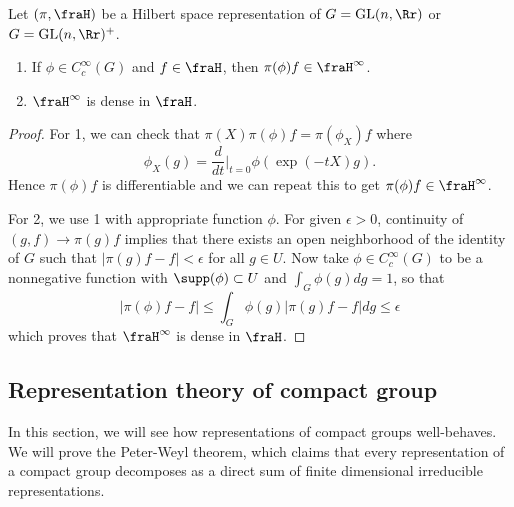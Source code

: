 \begin{proposition}
Let $(\pi, \fraH)$ be a Hilbert space representation of $G = \GL(n, \Rr)$ or $G = \GL(n, \Rr)^{+}$. 
\begin{enumerate}
\item If $\phi\in C_{c}^{\infty}(G)$ and $f\in \fraH$, then $\pi(\phi)f \in \fraH^{\infty}$. 
\item $\fraH^{\infty}$ is dense in $\fraH$. 
\end{enumerate}
\end{proposition}
\begin{proof}
For 1, we can check that $\pi(X)\pi(\phi)f = \pi(\phi_{X})f$ where $$\phi_{X}(g) = \frac{d}{dt}\Big|_{t=0} \phi(\exp(-tX)g).$$ 
Hence $\pi(\phi)f$ is differentiable and we can repeat this to get $\pi(\phi)f\in \fraH^{\infty}$. 

For 2, we use 1 with appropriate function $\phi$. For given $\epsilon>0$, continuity of $(g, f)\to \pi(g)f$ implies that there exists an open neighborhood of the identity of $G$ such that $|\pi(g)f - f|<\epsilon$ for all $g\in U$. 
Now take $\phi\in C_{c}^{\infty}(G)$ to be a nonnegative function with $\supp(\phi)\subset U$ and $\int_{G}\phi(g) dg = 1$, so that 
$$
|\pi(\phi)f - f| \leq \int_{G} \phi(g)|\pi(g)f - f|dg \leq \epsilon
$$
which proves that $\fraH^{\infty}$ is dense in $\fraH$. 
\end{proof}








\subsection{Representation theory of compact group}
In this section, we will see how representations of compact groups well-behaves. We will prove the Peter-Weyl theorem, which claims that every representation of a compact group decomposes as a direct sum of finite dimensional irreducible representations. 

